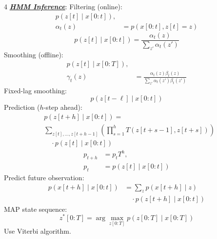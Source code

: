 \documentclass[12pt]{article}
\newcommand{\bulletPoint}[1]{\ul{\textit{\textbf{#1}}}}
\begin{document}
\begin{multicols*}{4}
\bulletPoint{HMM Inference}:
Filtering (online):
\useshortskip \begin{equation*}
    \begin{split}
        p(z[t]\mid x[0:t]),\\
        \alpha_t(z)&=p(x[0:t],z[t]=z)
    \end{split}
\end{equation*}
\useshortskip \begin{equation*}
    p(z[t]\mid x[0:t])=
    \frac{\alpha_t(z)}{\sum_{z'}\alpha_t(z')}
\end{equation*}
Smoothing (offline):
\useshortskip \begin{equation*}
    \begin{split}
        p(z[t]\mid x[0:T]),\\
        \gamma_t(z)&=
        \frac{\alpha_t(z)\beta_t(z)}
        {\sum_{z'}\alpha_t(z')\beta_t(z')}
    \end{split}
\end{equation*}
Fixed-lag smoothing:
\useshortskip \begin{equation*}
    p(z[t-\ell]\mid x[0:t])
\end{equation*}
Prediction ($h$-step ahead):
\useshortskip \begin{equation*}
    \begin{split}
        &p(z[t+h]\mid x[0:t])= \\
        &\sum_{z[t],\ldots,z[t+h-1]}\left(\prod_{s=1}^{h}T(z[t+s-1],z[t+s])\right)\\
        &\quad\cdot p(z[t]\mid x[0:t])
    \end{split}
\end{equation*}
\useshortskip \begin{equation*}
    \begin{split}
        p_{t+h}&=p_tT^h,\\
        p_t&=p(z[t]\mid x[0:t])
    \end{split}
\end{equation*}
Predict future observation:
\useshortskip \begin{equation*}
    \begin{split}
        p(x[t+h]\mid x[0:t])
        &=\sum_z p(x[t+h]\mid z)\\
        &\quad\cdot p(z[t+h]\mid x[0:t])
    \end{split}
\end{equation*}
MAP state sequence:
\useshortskip \begin{equation*}
    z^*[0:T]=\arg\max_{z[0:T]}p(z[0:T]\mid x[0:T])
\end{equation*}
Use Viterbi algorithm.


\end{multicols*}
\end{document}
